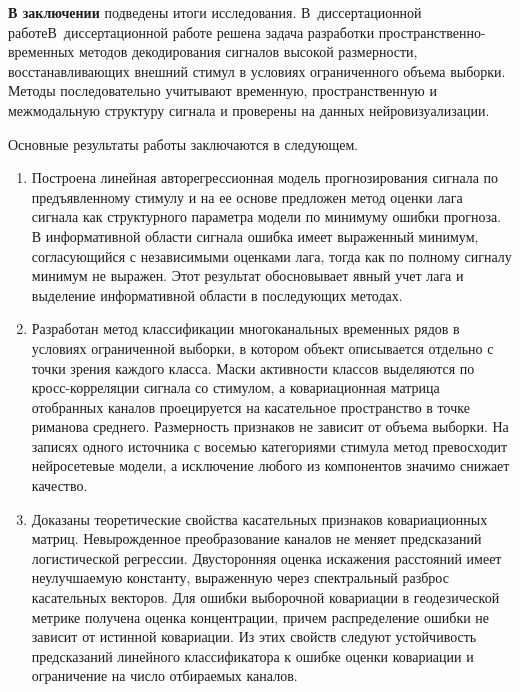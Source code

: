 \ifsynopsis\textbf{В заключении} подведены итоги исследования. В~диссертационной работе\else В~диссертационной работе\fi{} решена задача разработки пространственно-временных методов декодирования сигналов высокой размерности, восстанавливающих внешний стимул в условиях ограниченного объема выборки. Методы последовательно учитывают временную, пространственную и межмодальную структуру сигнала и проверены на данных нейровизуализации.

Основные результаты работы заключаются в следующем.
\begin{enumerate}
    \item Построена линейная авторегрессионная модель прогнозирования сигнала по предъявленному стимулу и на ее основе предложен метод оценки лага сигнала как структурного параметра модели по минимуму ошибки прогноза. В информативной области сигнала ошибка имеет выраженный минимум, согласующийся с независимыми оценками лага, тогда как по полному сигналу минимум не выражен. Этот результат обосновывает явный учет лага и выделение информативной области в последующих методах.
    \item Разработан метод классификации многоканальных временных рядов в условиях ограниченной выборки, в котором объект описывается отдельно с точки зрения каждого класса. Маски активности классов выделяются по кросс-корреляции сигнала со стимулом, а ковариационная матрица отобранных каналов проецируется на касательное пространство в точке риманова среднего. Размерность признаков не зависит от объема выборки. На записях одного источника с восемью категориями стимула метод превосходит нейросетевые модели, а исключение любого из компонентов значимо снижает качество.
    \item Доказаны теоретические свойства касательных признаков ковариационных матриц. Невырожденное преобразование каналов не меняет предсказаний логистической регрессии. Двусторонняя оценка искажения расстояний имеет неулучшаемую константу, выраженную через спектральный разброс касательных векторов. Для ошибки выборочной ковариации в геодезической метрике получена оценка концентрации, причем распределение ошибки не зависит от истинной ковариации.\ifsynopsis\else{} Из этих свойств следуют устойчивость предсказаний линейного классификатора к ошибке оценки ковариации и ограничение на число отбираемых каналов.\fi{}

\end{enumerate}
